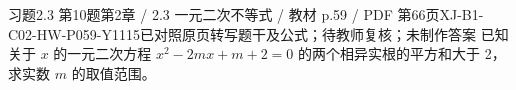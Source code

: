 \par\noindent\begin{minipage}{\linewidth}
\begin{bankitem}{习题2.3 第10题}{第2章 / 2.3 一元二次不等式 / 教材 p.59 / PDF 第66页}{XJ-B1-C02-HW-P059-Y1115}{已对照原页转写题干及公式；待教师复核；未制作答案}
已知关于 $x$ 的一元二次方程 $x^2-2mx+m+2=0$ 的两个相异实根的平方和大于 2，求实数 $m$ 的取值范围。
\end{bankitem}
\end{minipage}\par\medskip
